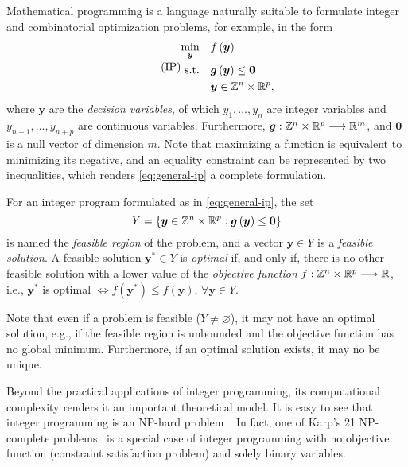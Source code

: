 Mathematical programming is a language naturally suitable to formulate integer and combinatorial optimization problems, for example, in the form
\begin{equation}\label{eq:general-ip}\tag{IP}
    \begin{split}
	\min_{\bm{y}} \quad & f\left( \bm{y} \right) \\
	\textrm{s.t.} \quad & \bm{g}\left( \bm{y} \right) \le \bm{0} \\
	  & \bm{y} \in \mathbb{Z}^{n}\times \mathbb{R}^{p}
    ,\end{split}
\end{equation}
where $\bm{y}$ are the \emph{decision variables}, of which $y_1,\ldots,y_n$ are integer variables and $y_{n+1},\ldots,y_{n+p}$ are continuous variables.
Furthermore, $\bm{g}: \mathbb{Z}^{n}\times \mathbb{R}^{p} \longrightarrow \mathbb{R}^{m}$,  and $\bm{0}$ is a null vector of dimension $m$.
Note that maximizing a function is equivalent to minimizing its negative, and an equality constraint can be represented by two inequalities, which renders \eqref{eq:general-ip} a complete formulation.

For an integer program formulated as in \eqref{eq:general-ip}, the set \[
Y=\left\{ \bm{y}\in \mathbb{Z}^{n}\times \mathbb{R}^{p}: \bm{g}\left( \bm{y} \right) \le \bm{0}\right\} 
\] is named the \emph{feasible region} of the problem, and a vector $\bm{y}\in Y$ is a \emph{feasible solution}.
A feasible solution $\bm{y}^{*}\in Y$ is \emph{optimal} if, and only if, there is no other feasible solution with a lower value of the \emph{objective function} $f: \mathbb{Z}^{n}\times \mathbb{R}^{p} \longrightarrow \mathbb{R}$, i.e., $\bm{y}^{*}$ is optimal $\iff f(\bm{y}^{*}) \le f(\bm{y}) ,\,\forall \bm{y}\in Y$.

Note that even if a problem is feasible ($Y\neq \varnothing$), it may not have an optimal solution, e.g., if the feasible region is unbounded and the objective function has no global minimum.
Furthermore, if an optimal solution exists, it may no be unique.

Beyond the practical applications of integer programming, its computational complexity renders it an important theoretical model.
It is easy to see that integer programming is an NP-hard problem~\cite{nemhauserIntegerCombinatorialOptimization1999}.
In fact, one of Karp's 21 NP-complete problems~\cite{karpReducibilityCombinatorialProblems1972} is a special case of integer programming with no objective function (constraint satisfaction problem) and solely binary variables.

